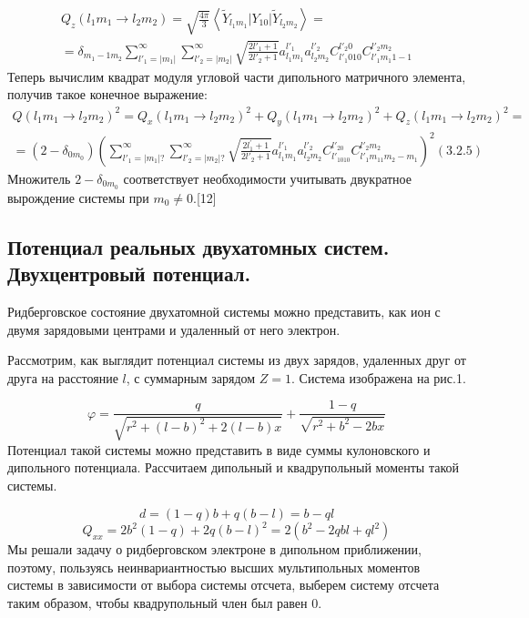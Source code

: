 \begin{multline*}
Q_z\left(l_1m_1\rightarrow l_2m_2\right)=\sqrt{\frac{4\pi } 3} \left< \widetilde Y_{l_1m_1}|Y_{10}|\widetilde Y_{l_2m_2} \right> =
\\
= \delta_{m_1-1 m_2}\sum_{l'_1=|m_1|}^{\infty} \sum_{l'_2=|m_2|}^{\infty}\sqrt{\frac{2l'_1+1}{2l'_2+1}}a_{l_1 m_1}^{l'_1 } a_{l_2 m_2}^{l'_2} C_{l'_1 010}^{l'_2 0} C_{l'_1 m_1 1-1}^{l'_2 m_2 }
\end{multline*}
Теперь вычислим квадрат модуля угловой части дипольного матричного элемента, получив такое конечное выражение:
\begin{multline*}
	Q\left(l_1m_1\rightarrow l_2m_2\right)^2=
Q_x\left(l_1m_1\rightarrow l_2m_2\right)^2+Q_y\left(l_1m_1\rightarrow l_2m_2\right)^2+Q_z\left(l_1m_1\rightarrow l_2m_2\right)^2 =
\\
= \left(2-\delta _{0m_0}\right)\left(\sum _{l'_1=| m_1|
	?}^{\infty}\sum _{l'_2=| m_2|
	?}^{\infty} \sqrt{\frac{2l^{'}_1+1}{2l{'}_2+1}}a_{l_1m_1}^{l{'}_1}a_{l_2m_2}^{l{'}_2}C_{l{'}_1010}^{l{'}_20}C_{l{'}_1 m_11 m_2-m_1}^{l{'}_2m_2}\right)^2(3.2.5)
\end{multline*}
Множитель  $2-\delta _{0m_0}$ соответствует необходимости учитывать двукратное вырождение системы при  $m_0{\neq}0$.{[12]}

\subsection{Потенциал
реальных двухатомных систем. Двухцентровый
потенциал.}
{\par}
Ридберговское состояние двухатомной системы можно представить, как ион с двумя зарядовыми центрами и удаленный от него электрон.

Рассмотрим, как выглядит потенциал системы из двух зарядов, удаленных друг от друга на
расстояние $l$, с суммарным зарядом $Z=1$. Система
изображена на рис.1.

\begin{equation*}
\varphi =\frac q{\sqrt{r^2+(l-b)^2+2(l-b)x}}+\frac{1-q}{\sqrt{r^2+b^2-2\mathit{bx}}}
\end{equation*}
Потенциал такой системы можно представить в виде суммы кулоновского и дипольного потенциала. Рассчитаем дипольный и квадрупольный моменты такой системы.

\begin{equation*}
d=\left(1-q\right)b+q\left(b-l\right)=b-\mathit{ql}
\end{equation*}
\begin{equation*}
Q_{\mathit{xx}}=2b^2\left(1-q\right)+2q\left(b-l\right)^2=2\left(b^2-2q\mathit{bl}+ql^2\right)
\end{equation*}
Мы решали задачу о ридберговском электроне в дипольном приближении, поэтому, пользуясь неинвариантностью высших мультипольных моментов системы в зависимости от выбора системы отсчета, выберем систему отсчета таким образом, чтобы квадрупольный член был равен 0.

